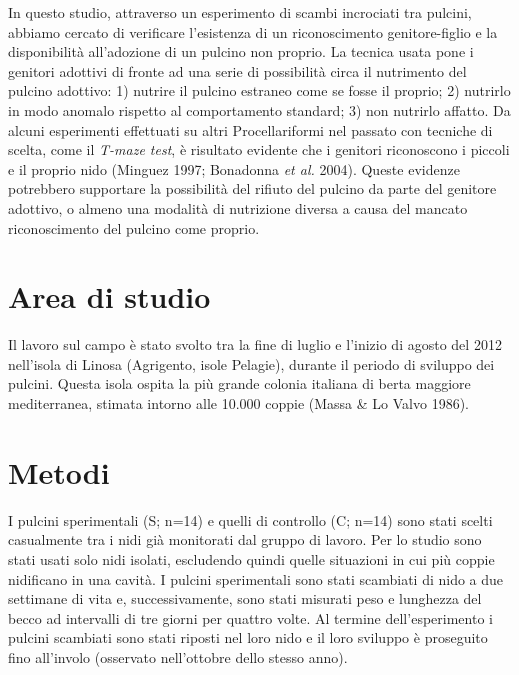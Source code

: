 In questo studio, attraverso un esperimento di scambi incrociati tra
pulcini, abbiamo cercato di verificare l{\textquoteright}esistenza di
un riconoscimento genitore-figlio e la disponibilit\`a
all{\textquoteright}adozione di un pulcino non proprio. La tecnica
usata pone i genitori adottivi di fronte ad una serie di possibilit\`a
circa il nutrimento del pulcino adottivo: 1) nutrire il pulcino
estraneo come se fosse il proprio; 2) nutrirlo in modo anomalo rispetto
al comportamento standard; 3) non nutrirlo affatto. Da alcuni
esperimenti effettuati su altri Procellariformi nel passato con
tecniche di scelta, come il \textit{T-maze test}, \`e risultato
evidente che i genitori riconoscono i piccoli e il proprio nido
(Minguez 1997; Bonadonna \textit{et al.} 2004). Queste evidenze
potrebbero supportare la possibilit\`a del rifiuto del pulcino da parte
del genitore adottivo, o almeno una modalit\`a di nutrizione diversa a
causa del mancato riconoscimento del pulcino come proprio. 

\section*{Area di studio}

Il lavoro sul campo \`e stato svolto tra la fine di luglio e
l{\textquoteright}inizio di agosto del 2012 nell{\textquoteright}isola
di Linosa (Agrigento, isole Pelagie), durante il periodo di sviluppo
dei pulcini. Questa isola ospita la pi\`u grande colonia italiana di
berta maggiore mediterranea, stimata intorno alle 10.000 coppie (Massa
\& Lo Valvo 1986). 

\section*{Metodi}

I pulcini sperimentali (S; n=14) e quelli di controllo (C; n=14) sono
stati scelti casualmente tra i nidi gi\`a monitorati dal gruppo di
lavoro. Per lo studio sono stati usati solo nidi isolati, escludendo
quindi quelle situazioni in cui pi\`u coppie nidificano in una
cavit\`a. I pulcini sperimentali sono stati scambiati di nido a due
settimane di vita e, successivamente, sono stati misurati peso e
lunghezza del becco ad intervalli di tre giorni per quattro volte. Al
termine dell{\textquoteright}esperimento i pulcini scambiati sono stati
riposti nel loro nido e il loro sviluppo \`e proseguito fino
all{\textquoteright}involo (osservato nell{\textquoteright}ottobre
dello stesso anno). 

